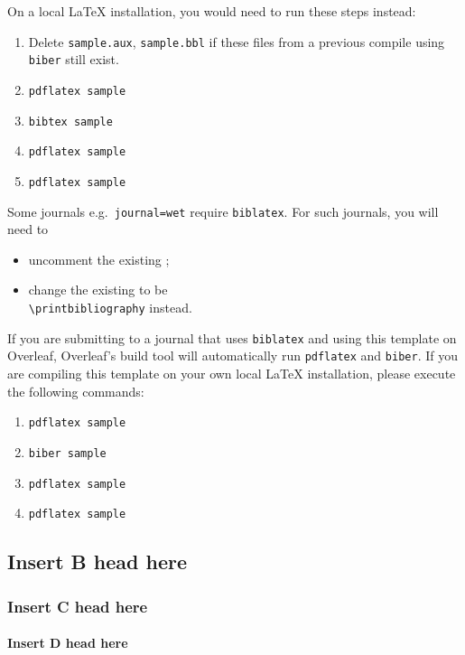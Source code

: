 \documentclass[journal=eds]{CAM-MODERN}%
\theoremstyle{definition}
\numberwithin{equation}{section}
\begin{document}
On a local \LaTeX{} installation, you would need to run these steps instead:
\begin{enumerate}
    \item Delete \texttt{sample.aux}, \texttt{sample.bbl} if these files from a previous compile using \texttt{biber} still exist.
    \item \verb|pdflatex sample|
    \item \verb|bibtex sample|
    \item \verb|pdflatex sample|
    \item \verb|pdflatex sample|
\end{enumerate}

Some journals e.g.~\texttt{journal=wet} require \texttt{biblatex}. For such journals, you will need to
\begin{itemize}
    \item uncomment the existing \verb||;
    \item change the existing \verb|| to be\\
    \verb|\printbibliography| instead.
\end{itemize} 

If you are submitting to a journal that uses \texttt{biblatex} and using this template on Overleaf, Overleaf's build tool will automatically run \texttt{pdflatex} and \texttt{biber}. If you are compiling this template on your own local \LaTeX{} installation, please execute the following commands:
\begin{enumerate}
    \item \verb|pdflatex sample|
    \item \verb|biber sample|
    \item \verb|pdflatex sample|
    \item \verb|pdflatex sample|
\end{enumerate}

\subsection{Insert B head here}

\lipsum[2]

\subsubsection{Insert C head here}

\lipsum[3]

\paragraph{Insert D head here}
\end{document}
